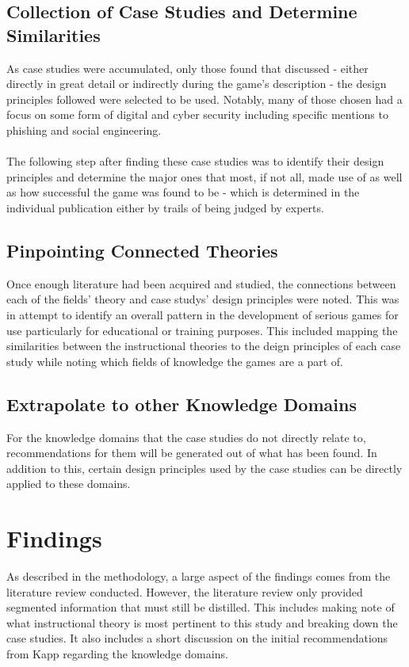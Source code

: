 \documentclass[conference]{IEEEtran}
\begin{document}
\subsection{Collection of Case Studies and Determine Similarities}
As case studies were accumulated, only those found that discussed - either directly in great detail or indirectly during the game's description - the design principles followed were selected to be used. Notably, many of those chosen had a focus on some form of digital and cyber security including specific mentions to phishing and social engineering\cite{Sheng2007, Dincelli2020}. 
\\\\
The following step after finding these case studies was to identify their design principles and determine the major ones that most, if not all, made use of as well as how successful the game was found to be - which is determined in the individual publication either by trails of being judged by experts.

\subsection{Pinpointing Connected Theories}
Once enough literature had been acquired and studied, the connections between each of the fields' theory and case studys' design principles were noted. This was in attempt to identify an overall pattern in the development of serious games for use particularly for educational or training purposes. This included mapping the similarities between the instructional theories to the deign principles of each case study while noting which fields of knowledge the games are a part of.  

\subsection{Extrapolate to other Knowledge Domains}
For the knowledge domains that the case studies do not directly relate to, recommendations for them will be generated out of what has been found. In addition to this, certain design principles used by the case studies can be directly applied to these domains.

\section{Findings}
As described in the methodology, a large aspect of the findings comes from the literature review conducted. However, the literature review only provided segmented information that must still be distilled. This includes making note of what instructional theory is most pertinent to this study and breaking down the case studies. It also includes a short discussion on the initial recommendations from Kapp\cite{Kapp2012a} regarding the knowledge domains.
\end{document}

